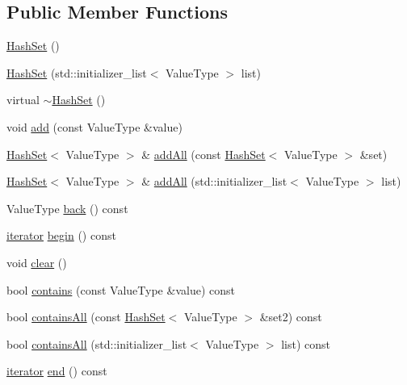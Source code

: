 \subsection*{Public Member Functions}
\begin{DoxyCompactItemize}
\item 
\mbox{\hyperlink{classHashSet_aa4f0e7330b8f252895e4efe56ff777e9}{Hash\+Set}} ()
\item 
\mbox{\hyperlink{classHashSet_a465424553c693215f7bd49a3459ff446}{Hash\+Set}} (std\+::initializer\+\_\+list$<$ Value\+Type $>$ list)
\item 
virtual \mbox{\hyperlink{classHashSet_ac92d8361caa78dd6d9e4fe122df697ad}{$\sim$\+Hash\+Set}} ()
\item 
void \mbox{\hyperlink{classHashSet_ab901606bf3a8019c986f0cf9a9f298dc}{add}} (const Value\+Type \&value)
\item 
\mbox{\hyperlink{classHashSet}{Hash\+Set}}$<$ Value\+Type $>$ \& \mbox{\hyperlink{classHashSet_ac8bf89539d8c88f5af81597d7646bfae}{add\+All}} (const \mbox{\hyperlink{classHashSet}{Hash\+Set}}$<$ Value\+Type $>$ \&set)
\item 
\mbox{\hyperlink{classHashSet}{Hash\+Set}}$<$ Value\+Type $>$ \& \mbox{\hyperlink{classHashSet_a19b47d1079e460fc4024ee92a043546f}{add\+All}} (std\+::initializer\+\_\+list$<$ Value\+Type $>$ list)
\item 
Value\+Type \mbox{\hyperlink{classHashSet_a38cbd80c93f450dc9bf3ca7c6a6220bd}{back}} () const
\item 
\mbox{\hyperlink{classHashSet_1_1iterator}{iterator}} \mbox{\hyperlink{classHashSet_a0c62c15c8ed609e7e5e9518cf5f5c712}{begin}} () const
\item 
void \mbox{\hyperlink{classHashSet_ac8bb3912a3ce86b15842e79d0b421204}{clear}} ()
\item 
bool \mbox{\hyperlink{classHashSet_a6fbc1a150987e7e5320d244a3baeb560}{contains}} (const Value\+Type \&value) const
\item 
bool \mbox{\hyperlink{classHashSet_a68e794b576a575978d156ca6ccdb45bb}{contains\+All}} (const \mbox{\hyperlink{classHashSet}{Hash\+Set}}$<$ Value\+Type $>$ \&set2) const
\item 
bool \mbox{\hyperlink{classHashSet_ab1015353723ba6d764f48aeceeff5799}{contains\+All}} (std\+::initializer\+\_\+list$<$ Value\+Type $>$ list) const
\item 
\mbox{\hyperlink{classHashSet_1_1iterator}{iterator}} \mbox{\hyperlink{classHashSet_a68b688a51bd0cf6fb5bc2cba292209a8}{end}} () const
\item 

\end{DoxyCompactItemize}
